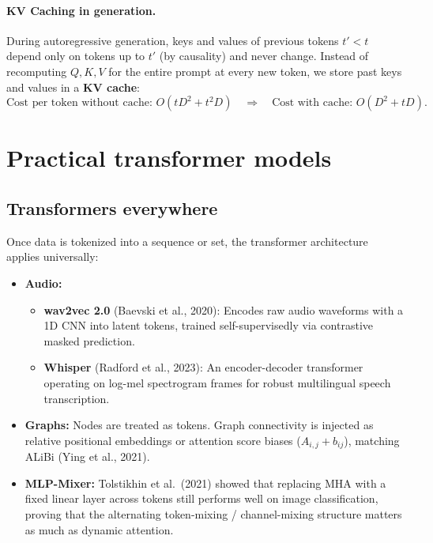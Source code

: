 \documentclass[11pt,a4paper]{article}
\newcommand{\slides}[1]{\par\nopagebreak\noindent{\normalfont\small\emph{(slides #1)}}\par\nopagebreak\vspace{2pt}}
\theoremstyle{definition}
\theoremstyle{plain}
\begin{document}
\paragraph{KV Caching in generation.}
During autoregressive generation, keys and values of previous tokens $t' < t$ depend only on tokens up to $t'$ (by causality) and never change. Instead of recomputing $Q, K, V$ for the entire prompt at every new token, we store past keys and values in a \textbf{KV cache}:
\begin{equation}
\text{Cost per token without cache: } O(t D^2 + t^2 D) \quad \Longrightarrow \quad \text{Cost with cache: } O(D^2 + t D).
\end{equation}

\section{Practical transformer models}\slides{75--83 / 84}

\subsection{Transformers everywhere}\slides{75 / 84}
Once data is tokenized into a sequence or set, the transformer architecture applies universally:
\begin{itemize}
\item \textbf{Audio:}
  \begin{itemize}[nosep]
  \item \textbf{wav2vec 2.0} (Baevski et al., 2020): Encodes raw audio waveforms with a 1D CNN into latent tokens, trained self-supervisedly via contrastive masked prediction.
  \item \textbf{Whisper} (Radford et al., 2023): An encoder-decoder transformer operating on log-mel spectrogram frames for robust multilingual speech transcription.
  \end{itemize}
\item \textbf{Graphs:} Nodes are treated as tokens. Graph connectivity is injected as relative positional embeddings or attention score biases ($A_{i,j} + b_{ij}$), matching ALiBi (Ying et al., 2021).
\item \textbf{MLP-Mixer:} Tolstikhin et al.\ (2021) showed that replacing MHA with a fixed linear layer across tokens still performs well on image classification, proving that the alternating token-mixing / channel-mixing structure matters as much as dynamic attention.
\end{itemize}
\end{document}
